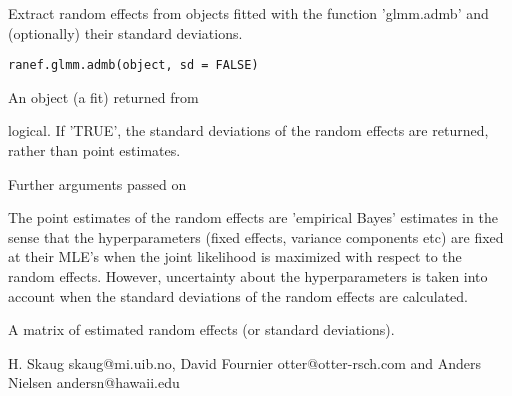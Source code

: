 \begin{Description}\relax
Extract random effects from objects fitted with the function 'glmm.admb' 
and (optionally) their standard deviations.
\end{Description}
\begin{Usage}
\begin{verbatim}
ranef.glmm.admb(object, sd = FALSE)
\end{verbatim}
\end{Usage}
\begin{Arguments}
\begin{ldescription}
\item[\code{object}] An object (a fit) returned from 
\item[\code{sd}] logical.  If 'TRUE', the standard deviations of the random effects are
returned, rather than point estimates.
\item[\code{...}] Further arguments passed on
\end{ldescription}
\end{Arguments}
\begin{Details}\relax
The point estimates of the random effects are 'empirical Bayes' estimates in
the sense that the hyperparameters (fixed effects, variance components etc) are fixed
at their MLE's when the joint likelihood is maximized with respect to the random effects.
However, uncertainty about the hyperparameters is taken into account when the 
standard deviations of the random effects are calculated.
\end{Details}
\begin{Value}
A matrix of estimated random effects (or standard deviations).
\end{Value}
\begin{Author}\relax
H. Skaug skaug@mi.uib.no, David Fournier otter@otter-rsch.com and
Anders Nielsen andersn@hawaii.edu
\end{Author}
\begin{SeeAlso}\relax
{}
\end{SeeAlso}

